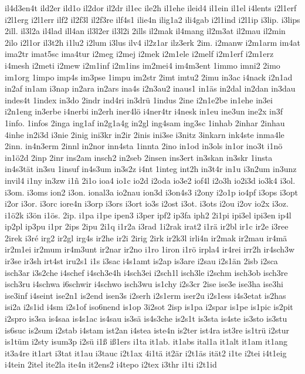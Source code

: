 {il4d3en4t
ild2er
ild1o
il2dor
il2dr
il1ec
ile2h
il1ehe
ileid4
il1ein
il1el
i4lents
i2l1erf
i2l1erg
i2l1err
ilf2
il2f3l
il2f3re
ilf4s1
ilie4n
ilig1a2
ili4gab
i2l1ind
i2l1ip
i3lip.
i3lips
2ill.
il3l2a
il4lad
ill4an
il3l2er
il3l2i
2ills
il2mak
il4mang
il2m3at
il2mau
il2min
2ilo
i2l1or
il3t2h
i1lu2
i2lum
i3lus
ilv4
il2z1ar
ilz3erk
2im.
i2manw
i2m1arm
im4at
ima2tr
imat5sc
ima4tur
i2meg
i2mej
i2mek
i2m1ele
i2melf
i2m1erf
i2m1erz
i4mesh
i2meti
i2mew
i2m1inf
i2m1ins
im2mei4
im4m3ent
1immo
imni2
2imo
im1org
1impo
imp4s
im3pse
1impu
im2str
2imt
imtu2
2imu
in3ac
i4nack
i2n1ad
in2af
in1am
i3nap
in2ara
in2ars
ina4s
i2n3au2
inaus1
in1äs
in2dal
in2dan
in3dau
indes4t
1index
in3do
2indr
ind4ri
in3drü
1indus
2ine
i2n1e2be
in1ehe
in3ei
i2n1eng
in3erbe
i4nerbi
in2erh
iner4lö
i4ner4tr
i4nesk
in1eu
ine3un
ine2x
in3f
1info.
1infos
2inga
ing1af
in2g1a4g
in2gl
ing4sam
ing3sc
1inhab
2inhar
2inhau
4inhe
in2i3d
i3nie
2inig
ini3kr
in2ir
2inis
ini3se
i3nitz
3inkarn
ink4ste
inma4le
2inn.
in4n3erm
2innl
in2nor
inn4sta
1innta
2ino
in1od
in3ols
in1or
ino3t
i1nö
in1ö2d
2inp
2inr
ins2am
insch2
in2seb
2insen
ins3ert
in3skan
in3skr
1insta
in4s3tät
in3su
1insuf
in4s3um
in3s2z
i4nt
1integ
int2h
in3t4r
in1u
i3n2um
in3unz
invil4
i1ny
in3zw
i1ñ
2i1o
ioa4
io1c
io2d
i2oda
io3e2
iof4l
i2o3h
io2i3d
io3k4
i3ol.
i3om.
i3oms
ion2
i3on.
ional3a
io2nau
ion3d
i3on4s3
i2ony
i2o1p
io4pf
i3ops
i3opt
i2or
i3or.
i3orc
iore4n
i3orp
i3ors
i3ort
io3s
i2ost
i3ot.
i3ots
i2ou
i2ov
io2x
i3oz.
i1ö2k
i3ön
i1ös.
2ip.
i1pa
i1pe
ipen3
i3per
ipf2
ip3fa
iph2
2i1pi
ipi3el
ipi3en
ip4l
ip2pl
ip3pu
i1pr
2ips
2ipu
2i1q
i1r2a
i3rad
1i2rak
irat2
i1rä
ir2bl
ir1c
ir2e
i3ree
2irek
i3ré
irg2
ir2gl
irg4s
ir2he
ir2i
2irig
2irk
ir2k3l
irli4n
ir2mak
ir2mau
ir4mä
ir2m1ei
ir2mum
ir4m3unt
ir2nar
ir2no
i1ro
1iron
i1rö
irpla4
ir4rei
irr2h
ir4sch3w
ir3se
ir3sh
irt4st
iru2s1
i1s
i3sac
i4s1amt
is2ap
is3are
i2sau
i2s1än
2isb
i2sca
isch3ar
i3s2che
i4schef
i4sch3e4h
i4sch3ei
i2sch1l
isch3le
i2schm
isch3ob
isch3re
isch3ru
i4schwa
i6schwir
i4schwo
isch3wu
is1chy
i2s3cr
2ise
ise3e
ise3ha
ise3hi
ise3inf
i4seint
ise2n1
is2end
isen3s
i2serh
i2s1erm
iser2u
i2s1ess
i4s3etat
is2has
isi2a
i2s1id
i4sm
i2s1of
iso6nend
is1op
3i2sot
2isp
is1pa
i2spar
is1pe
is1pic
is2pit
i2spro
is3sa
is4saa
is4s1ac
is4sau
is3sä
is4s3che
is2s1t
is3sta
is4ste
is3sto
is3stu
is6suc
is2sum
i2stab
i4stam
ist2an
i4stea
iste4n
is2ter
ist4ra
ist3re
is1trü
i2stur
is1tüm
i2sty
isum3p
i2sü
i1ß
iß1ers
i1ta
it1ab.
it1abs
ital1a
it1alt
it1am
it1ang
it3a4re
it1art
i3tat
it1au
i3tauc
i2t1ax
4i1tä
it2är
i2t1äs
ität2
i1te
i2tei
i4t1eig
i4tein
2itel
ite2la
ite4n
it2ens2
i4tepo
i2tex
i3thr
i1ti
i2t1id
}
